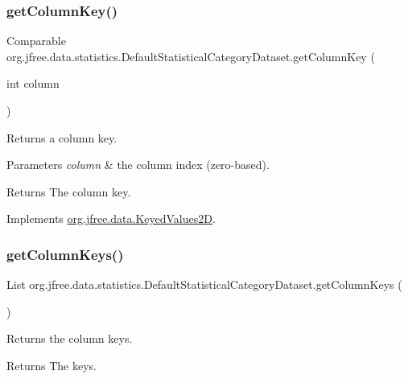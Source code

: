\subsubsection{\texorpdfstring{get\+Column\+Key()}{getColumnKey()}}
{\footnotesize\ttfamily Comparable org.\+jfree.\+data.\+statistics.\+Default\+Statistical\+Category\+Dataset.\+get\+Column\+Key (\begin{DoxyParamCaption}\item[{int}]{column }\end{DoxyParamCaption})}

Returns a column key.


\begin{DoxyParams}{Parameters}
{\em column} & the column index (zero-\/based).\\
\hline
\end{DoxyParams}
\begin{DoxyReturn}{Returns}
The column key. 
\end{DoxyReturn}


Implements \mbox{\hyperlink{interfaceorg_1_1jfree_1_1data_1_1_keyed_values2_d_a9ced6cbaf04f048db059e1ebf5184d2a}{org.\+jfree.\+data.\+Keyed\+Values2D}}.

\mbox{\label{classorg_1_1jfree_1_1data_1_1statistics_1_1_default_statistical_category_dataset_a7b6adfe3285ed140fc188ab1dbd154d7}} 
\subsubsection{\texorpdfstring{get\+Column\+Keys()}{getColumnKeys()}}
{\footnotesize\ttfamily List org.\+jfree.\+data.\+statistics.\+Default\+Statistical\+Category\+Dataset.\+get\+Column\+Keys (\begin{DoxyParamCaption}{ }\end{DoxyParamCaption})}

Returns the column keys.

\begin{DoxyReturn}{Returns}
The keys. 
\end{DoxyReturn}


